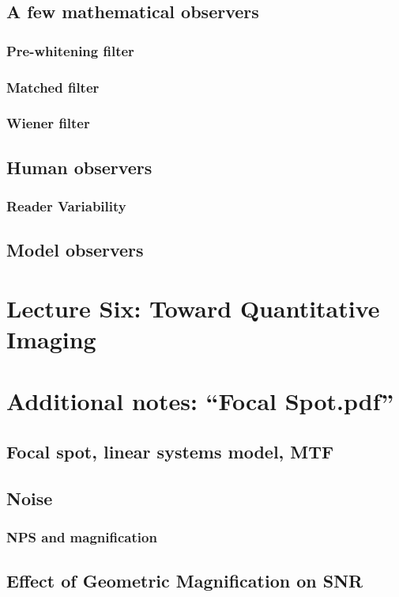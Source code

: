 \documentclass[11pt]{article}
\begin{document}
\subsection{A few mathematical observers}
\subsubsection{Pre-whitening filter}
\subsubsection{Matched filter}
\subsubsection{Wiener filter}
\subsection{Human observers}
\subsubsection{Reader Variability}
\subsection{Model observers}

\newpage
\section{Lecture Six: Toward Quantitative Imaging}

\newpage
\section{Additional notes: ``Focal Spot.pdf''}
\subsection{Focal spot, linear systems model, MTF}
\subsection{Noise}
\subsubsection{NPS and magnification}
\subsection{Effect of Geometric Magnification on SNR}
\end{document}
